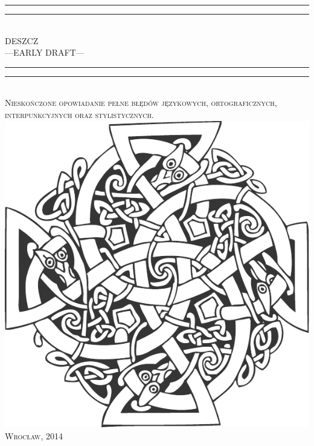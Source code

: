 \documentclass[9pt,openany,titlepage]{extbook}
\begin{document}
	\begin{titlepage}
		\centering
		\vspace*{\baselineskip}
		\rule{\textwidth}{1.6pt}\vspace*{-\baselineskip}\vspace*{2pt}
		\rule{\textwidth}{0.4pt}\\[\baselineskip]{
			\LARGE DESZCZ \\[0.3\baselineskip] ---EARLY DRAFT---
		}\\[0.2\baselineskip]
		\rule{\textwidth}{0.4pt}\vspace*{-\baselineskip}\vspace{3.2pt}
		\rule{\textwidth}{1.6pt}\\[\baselineskip]
		\scshape
		Nieskończone opowiadanie pełne błędów językowych, ortograficznych, \\
		interpunkcyjnych oraz stylistycznych. \\[\baselineskip] 
		\vspace*{4\baselineskip}
		\includegraphics[height=0.5\textheight]{ornament.pdf} 
		\vfill{\scshape Wrocław, 2014} \\[0.3\baselineskip]
	\end{titlepage}
	\thispagestyle{empty}
	\cleardoublepage
\end{document}
